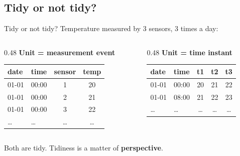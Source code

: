 \subsection{Tidy or not tidy?}

\begin{frame}{Tidy or not tidy?}
  Temperature measured by 3 sensors, 3 times a day:

  \vspace{0.3cm}
  \begin{columns}[T]
    \begin{column}{0.48\textwidth}
      \textbf{Unit = measurement event}\\[0.2cm]
      \centering\scriptsize
      \begin{tabular}{llcc}
        \toprule
        \textbf{date} & \textbf{time} & \textbf{sensor} & \textbf{temp} \\
        \midrule
        01-01 & 00:00 & 1 & 20 \\
        01-01 & 00:00 & 2 & 21 \\
        01-01 & 00:00 & 3 & 22 \\
        \dots & \dots & \dots & \dots \\
        \bottomrule
      \end{tabular}
    \end{column}
    \begin{column}{0.48\textwidth}
      \textbf{Unit = time instant}\\[0.2cm]
      \centering\scriptsize
      \begin{tabular}{llccc}
        \toprule
        \textbf{date} & \textbf{time} & \textbf{t1} & \textbf{t2} & \textbf{t3} \\
        \midrule
        01-01 & 00:00 & 20 & 21 & 22 \\
        01-01 & 08:00 & 21 & 22 & 23 \\
        \dots & \dots & \dots & \dots & \dots \\
        \bottomrule
      \end{tabular}
    \end{column}
  \end{columns}

  \vspace{0.3cm}
  Both are tidy. Tidiness is a matter of \textbf{perspective}.
\end{frame}

